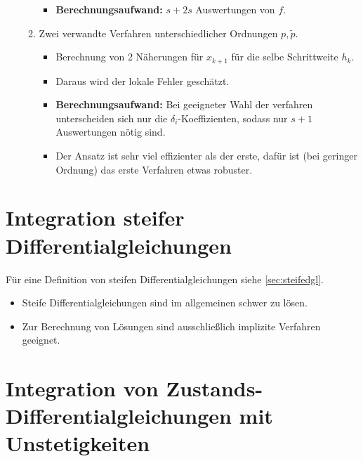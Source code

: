 \begin{itemize}
\begin{enumerate}
\begin{itemize}
								\item \textbf{Berechnungsaufwand:} \( s + 2s \) Auswertungen von \( f \).
							\end{itemize}
						\item Zwei verwandte Verfahren unterschiedlicher Ordnungen \( p, \tilde{p} \).
							\begin{itemize}
								\item Berechnung von 2 Näherungen für \( x _ { k + 1 } \) für die selbe Schrittweite \( h _ k \).
								\item Daraus wird der lokale Fehler geschätzt.
								\item \textbf{Berechnungsaufwand:} Bei geeigneter Wahl der verfahren unterscheiden sich nur die \( \delta _ i \)-Koeffizienten, sodass nur \( s + 1 \) Auswertungen nötig sind.
								\item Der Ansatz ist sehr viel effizienter als der erste, dafür ist (bei geringer Ordnung) das erste Verfahren etwas robuster.
							\end{itemize}
					\end{enumerate}
            \end{itemize}

    \section{Integration steifer Differentialgleichungen} %
        Für eine Definition von steifen Differentialgleichungen siehe \ref{sec:steifedgl}.
        
        \begin{itemize}
        	\item Steife Differentialgleichungen sind im allgemeinen schwer zu lösen.
        	\item Zur Berechnung von Lösungen sind ausschließlich implizite Verfahren geeignet.
        \end{itemize}

    \section{Integration von Zustands-Differentialgleichungen mit Unstetigkeiten} %
        \label{sec:integrationunstetig}
        
    
